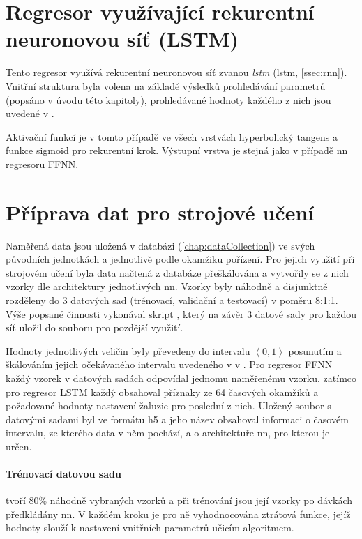     \section{Regresor využívající rekurentní neuronovou síť (LSTM)} \label{sec:lstm}
        Tento regresor využívá rekurentní neuronovou síť zvanou \emph{\acrlong{lstm}} (\acrshort{lstm}, \cref{ssec:rnn}). Vnitřní struktura byla volena na základě výsledků prohledávání parametrů (popsáno v úvodu \hyperref[chap:regresory]{této kapitoly}), prohledávané hodnoty každého z nich jsou uvedené v .
        
        Aktivační funkcí je v tomto případě ve všech vrstvách hyperbolický tangens a funkce sigmoid pro rekurentní krok. Výstupní vrstva je stejná jako v případě \acrshort{nn} regresoru FFNN.
        
    \section{Příprava dat pro strojové učení}
        Naměřená data jsou uložená v databázi (\cref{chap:dataCollection}) ve svých původních jednotkách a jednotlivě podle okamžiku pořízení. Pro jejich využití při strojovém učení byla data načtená z databáze přeškálována a vytvořily se z nich vzorky dle architektury jednotlivých \acrshort{nn}. Vzorky byly náhodně a disjunktně rozděleny do 3 datových sad (trénovací, validační a testovací) v poměru 8:1:1. Výše popsané činnosti vykonával skript , který na závěr 3 datové sady pro každou síť uložil do souboru pro pozdější využití.
        
        Hodnoty jednotlivých veličin byly převedeny do intervalu $\left\langle 0,1\right\rangle$ posunutím a škálováním jejich očekávaného intervalu uvedeného v  v . Pro regresor FFNN každý vzorek v datových sadách odpovídal jednomu naměřenému vzorku, zatímco pro regresor LSTM každý obsahoval příznaky ze 64 časových okamžiků a požadované hodnoty nastavení žaluzie pro poslední z nich. Uložený soubor s datovými sadami byl ve formátu h5 a jeho název obsahoval informaci o časovém intervalu, ze kterého data v něm pochází, a o architektuře \acrshort{nn}, pro kterou je určen.

        \paragraph{Trénovací datovou sadu} tvoří 80\% náhodně vybraných vzorků a při trénování jsou její vzorky po dávkách předkládány \acrshort{nn}. V každém kroku je pro ně vyhodnocována ztrátová funkce, jejíž hodnoty slouží k nastavení vnitřních parametrů učicím algoritmem.
